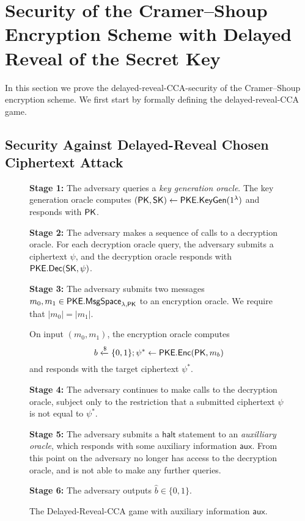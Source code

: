 \section{Security of the Cramer--Shoup Encryption Scheme with Delayed Reveal of the Secret Key}
\label{appendix-a}

In this section we prove the delayed-reveal-CCA-security of the Cramer--Shoup encryption scheme. We first start by formally defining the delayed-reveal-CCA game.

\subsection{Security Against Delayed-Reveal Chosen Ciphertext Attack}

\begin{figure}[ht!]
	\begin{framed}\small
		\textbf{Stage 1:} The adversary queries a \textit{key generation oracle}. The key generation oracle computes $(\mathsf{PK},\mathsf{SK})\leftarrow\mathsf{PKE}.\mathsf{KeyGen}(1^\lambda)$ and responds with $\mathsf{PK}$.
		
		\vspace{2mm}
		
		\textbf{Stage 2:} The adversary makes a sequence of calls to a decryption oracle. For each  decryption oracle query, the adversary submits a ciphertext $\psi$, and the decryption
		oracle responds with $\mathsf{PKE}.\mathsf{Dec}(\mathsf{SK},\psi)$.
		
		\vspace{2mm}
		
		\textbf{Stage 3:} The adversary submits two messages $m_0, m_1\in\mathsf{PKE}.\mathsf{MsgSpace}_{\lambda,\mathsf{PK}}$ to an encryption oracle. We require that $|m_0| = |m_1|$.
		
		On input $(m_0, m_1)$, the encryption oracle computes $$b\xleftarrow{\$}\{0,1\};\psi^*\gets\mathsf{PKE}.\mathsf{Enc}(\mathsf{PK},m_b)$$ and responds with the target ciphertext $\psi^{*}$.
		
		\vspace{2mm}
		
		\textbf{Stage 4:} The adversary continues to make calls to the decryption oracle, subject only to the restriction that a submitted ciphertext $\psi$ is not equal to $\psi^{*}$.
		
		\vspace{2mm}
		
		\textbf{Stage 5:} The adversary submits a $\mathsf{halt}$ statement to an \textit{auxilliary oracle}, which responds with some auxiliary information $\mathsf{aux}$. From this point on the adversary no longer has access to the decryption oracle, and is not able to make any further queries.
		
		\vspace{2mm}
		
		\textbf{Stage 6:} The adversary outputs $\hat{b}\in\{0,1\}$.
	\end{framed}
	\caption{The Delayed-Reveal-CCA game with auxiliary information $\mathsf{aux}$.}
	\label{fig:dcca}
\end{figure}

